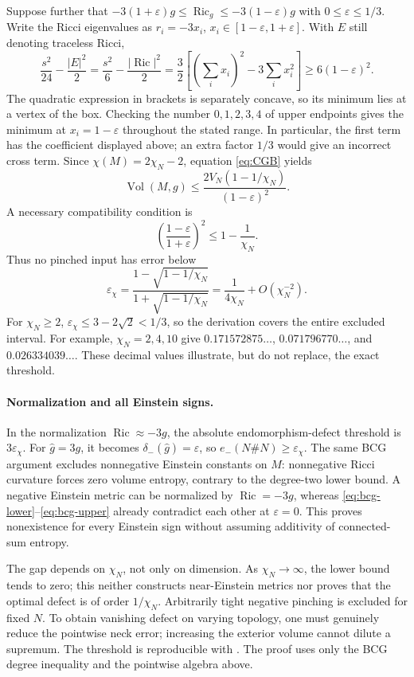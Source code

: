 \documentclass[a4paper,11pt]{article}
\numberwithin{equation}{section}
\theoremstyle{definition}
\newcommand{\Ric}{\operatorname{Ric}}
\newcommand{\Vol}{\operatorname{Vol}}
\begin{document}
Suppose further that $-3(1+\varepsilon)g\le\Ric_g\le-3(1-\varepsilon)g$ with $0\le\varepsilon\le1/3$. Write the Ricci eigenvalues as $r_i=-3x_i$, $x_i\in[1-\varepsilon,1+\varepsilon]$. With $E$ still denoting traceless Ricci,
\[
 \frac{s^2}{24}-\frac{|E|^2}{2}
 =\frac{s^2}{6}-\frac{|\Ric|^2}{2}
 =\frac32\left[\left(\sum_i x_i\right)^2-3\sum_i x_i^2\right]
 \ge6(1-\varepsilon)^2.
\]
The quadratic expression in brackets is separately concave, so its minimum lies at a vertex of the box. Checking the number $0,1,2,3,4$ of upper endpoints gives the minimum at $x_i=1-\varepsilon$ throughout the stated range.
In particular, the first term has the coefficient displayed above; an extra factor $1/3$ would give an incorrect cross term.
Since $\chi(M)=2\chi_N-2$, equation \eqref{eq:CGB} yields
\begin{equation}\label{eq:bcg-upper}
 \Vol(M,g)\le
 \frac{2V_N(1-1/\chi_N)}{(1-\varepsilon)^2}.
\end{equation}
A necessary compatibility condition is
\[
 \left(\frac{1-\varepsilon}{1+\varepsilon}\right)^2
 \le1-\frac1{\chi_N}.
\]
Thus no pinched input has error below
\begin{equation}\label{eq:bcg-threshold}
 \varepsilon_\chi=
 \frac{1-\sqrt{1-1/\chi_N}}{1+\sqrt{1-1/\chi_N}}
 =\frac1{4\chi_N}+O(\chi_N^{-2}).
\end{equation}
For $\chi_N\ge2$, $\varepsilon_\chi\le3-2\sqrt2<1/3$, so the derivation covers the entire excluded interval.
For example, $\chi_N=2,4,10$ give $0.171572875\ldots$, $0.071796770\ldots$, and $0.026334039\ldots$. These decimal values illustrate, but do not replace, the exact threshold.

\paragraph{Normalization and all Einstein signs.}
In the normalization $\Ric\approx-3g$, the absolute endomorphism-defect threshold is $3\varepsilon_\chi$.
For $\widehat g=3g$, it becomes $\delta_-(\widehat g)=\varepsilon$, so $e_-(N\#N)\ge\varepsilon_\chi$.
The same BCG argument excludes nonnegative Einstein constants on $M$: nonnegative Ricci curvature forces zero volume entropy, contrary to the degree-two lower bound. A negative Einstein metric can be normalized by $\Ric=-3g$, whereas \eqref{eq:bcg-lower}--\eqref{eq:bcg-upper} already contradict each other at $\varepsilon=0$.
This proves nonexistence for every Einstein sign without assuming additivity of connected-sum entropy.

The gap depends on $\chi_N$, not only on dimension.
As $\chi_N\to\infty$, the lower bound tends to zero; this neither constructs near-Einstein metrics nor proves that the optimal defect is of order $1/\chi_N$.
Arbitrarily tight negative pinching is excluded for fixed $N$. To obtain vanishing defect on varying topology, one must genuinely reduce the pointwise neck error; increasing the exterior volume cannot dilute a supremum.
The threshold is reproducible with . The proof uses only the BCG degree inequality \cite{BCG} and the pointwise algebra above.
\end{document}
